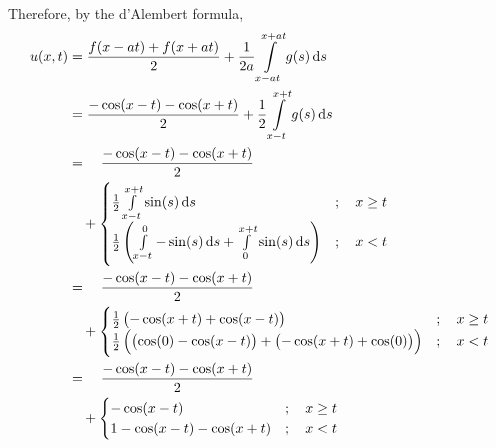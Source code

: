 \documentclass[fleqn, a4paper, 11pt, oneside]{amsart}
\theoremstyle{definition}
\theoremstyle{theorem}
\begin{document}
\begin{solution}
\begin{enumerate}[leftmargin=*]
\begin{align*}
			\end{align*}
			Therefore, by the d'Alembert formula,
			\begin{align*}
				u(x,t) &= \frac{f(x - a t) + f(x + a t)}{2} + \frac{1}{2 a} \int\limits_{x - a t}^{x + a t} g(s) \dif s\\
				&= \frac{-\cos(x - t) - \cos(x + t)}{2} + \frac{1}{2} \int\limits_{x - t}^{x + t} g(s) \dif s\\
				&= \quad \frac{-\cos(x - t) - \cos(x + t)}{2}\\
				&\quad +
					\begin{cases}
						\frac{1}{2} \int\limits_{x - t}^{x + t} \sin(s) \dif s                                                      & ;\quad x \ge t \\
						\frac{1}{2} \left( \int\limits_{x - t}^{0} -\sin(s) \dif s + \int\limits_{0}^{x + t} \sin(s) \dif s \right) & ;\quad x < t   \\
					\end{cases}\\
				&= \quad \frac{-\cos(x - t) - \cos(x + t)}{2}\\
				&\quad +
					\begin{cases}
						\frac{1}{2} \left( -\cos(x + t) + \cos(x - t) \right)                                                   & ;\quad x \ge t \\
						\frac{1}{2} \left( \left( \cos(0) - \cos(x - t) \right) + \left( -\cos(x + t) + \cos(0) \right) \right) & ;\quad x < t   \\
					\end{cases}\\
				&= \quad \frac{-\cos(x - t) - \cos(x + t)}{2}\\
				&\quad +
					\begin{cases}
						-\cos(x - t)                  & ;\quad x \ge t \\
						1 - \cos(x - t) - \cos(x + t) & ;\quad x < t   \\
					\end{cases}
			\end{align*}
	\end{enumerate}
\end{solution}
\end{document}
